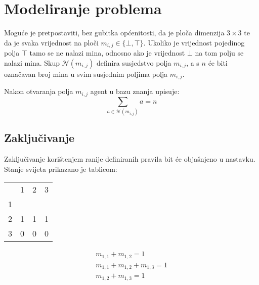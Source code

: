\documentclass{article}
\begin{document}
\section{Modeliranje problema}

Moguće je pretpostaviti, bez gubitka općenitosti, da je ploča dimenzija $3 \times 3$ te da je
svaka vrijednost na ploči $m_{i, j} \in \{\bot, \top\}$. Ukoliko je vrijednost pojedinog polja
$\top$ tamo se ne nalazi mina, odnosno ako je vrijednost $\bot$ na tom polju se nalazi mina.
Skup $\mathcal{N}(m_{i, j})$ definira susjedstvo polja $m_{i, j}$, a s $n$ će biti označavan broj mina
u svim susjednim poljima polja $m_{i, j}$.

Nakon otvaranja polja $m_{i, j}$ agent u bazu znanja upisuje:
\begin{equation}
    \sum_{a \in \mathcal{N}(m_{i, j})} a = n
\end{equation}

\subsection{Zaključivanje}
Zaključivanje korištenjem ranije definiranih pravila bit će objašnjeno u nastavku. Stanje
svijeta prikazano je tablicom:

\begin{table}[ht]
    \centering
    \begin{tabular}{llll}
                           & 1                      & 2                      & 3                      \\ \cline{2-4}
    \multicolumn{1}{l|}{1} & \multicolumn{1}{l|}{}  & \multicolumn{1}{l|}{}  & \multicolumn{1}{l|}{}  \\ \cline{2-4}
    \multicolumn{1}{l|}{2} & \multicolumn{1}{l|}{1} & \multicolumn{1}{l|}{1} & \multicolumn{1}{l|}{1} \\ \cline{2-4}
    \multicolumn{1}{l|}{3} & \multicolumn{1}{l|}{0} & \multicolumn{1}{l|}{0} & \multicolumn{1}{l|}{0}  \\ \cline{2-4}
    \end{tabular}
\end{table}

\begin{align*}
    m_{1, 1} + m_{1, 2} = 1 \\
    m_{1, 1} + m_{1, 2} + m_{1, 3} = 1 \\
    m_{1, 2} + m_{1, 3} = 1 \\
\end{align*}
\end{document}

